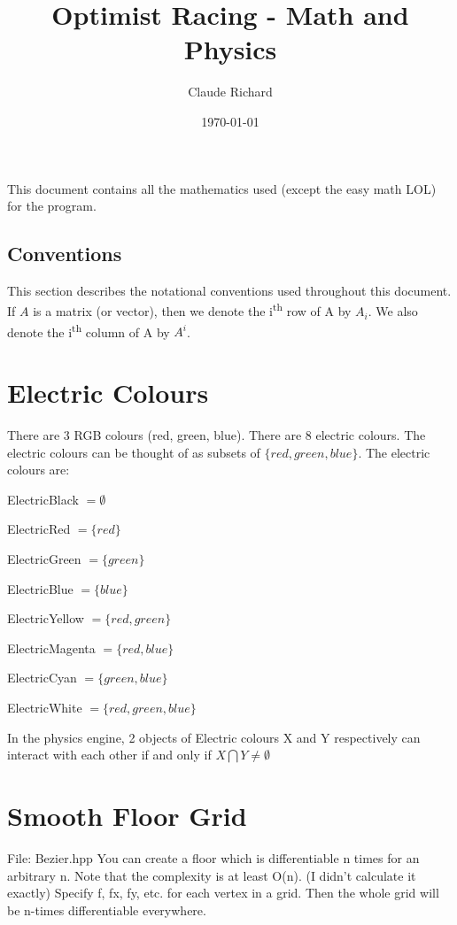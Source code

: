 \documentclass{article}
\title{Optimist Racing - Math and Physics}
\author{Claude Richard}
\date{\today}
\begin{document}
\label{start}

\maketitle
This document contains all the mathematics used (except the easy math LOL) for the program.

\subsection{Conventions}
This section describes the notational conventions used throughout this document.
If \(A\) is a matrix (or vector), then we denote the i\textsuperscript{th} row of A by \(A_i\).
We also denote the i\textsuperscript{th} column of A by \(A^i\).

\newpage



\section{Electric Colours}
There are 3 RGB colours (red, green, blue). There are 8 electric colours.
The electric colours can be thought of as subsets of \( \{ red, green, blue \} \).
The electric colours are:
\begin{basedescript}{\desclabelstyle{\pushlabel}\desclabelwidth{10em}}
\item [ElectricBlack] \(= \emptyset\)
\item [ElectricRed] \(= \{ red \}\)
\item [ElectricGreen] \(= \{ green \}\)
\item [ElectricBlue] \(= \{ blue \}\)
\item [ElectricYellow] \(= \{ red, green \}\)
\item [ElectricMagenta] \(= \{ red, blue \}\)
\item [ElectricCyan] \(= \{ green, blue \}\)
\item [ElectricWhite] \(= \{ red, green, blue \}\)
\end{basedescript}
In the physics engine, 2 objects of Electric colours X and Y respectively can interact with each other if and only if
\( X \bigcap Y \neq \emptyset \)

\newpage



\section{Smooth Floor Grid}
File: Bezier.hpp
You can create a floor which is differentiable n times for an arbitrary n.
Note that the complexity is at least O(n). (I didn't calculate it exactly)
Specify f, fx, fy, etc. for each vertex in a grid.
Then the whole grid will be n-times differentiable everywhere.
\end{document}
